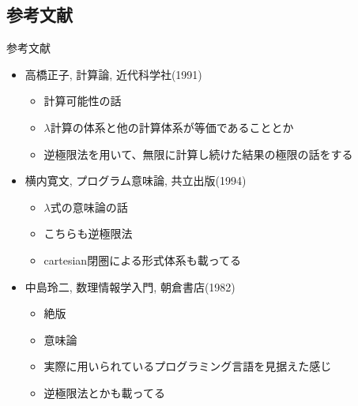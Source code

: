 \documentclass[pdflatex,17pt]{beamer}
\begin{document}
\subsection{参考文献}
\begin{frame}{参考文献}
    \scriptsize
    \begin{itemize}
        \item 高橋正子, 計算論, 近代科学社(1991)
        \begin{itemize}
        \scriptsize
            \item 計算可能性の話
            \item $\lambda$計算の体系と他の計算体系が等価であることとか
            \item 逆極限法を用いて、無限に計算し続けた結果の極限の話をする
        \end{itemize}
        \item 横内寛文, プログラム意味論, 共立出版(1994)
        \begin{itemize}
        \scriptsize
            \item $\lambda$式の意味論の話
            \item こちらも逆極限法
            \item cartesian閉圏による形式体系も載ってる
        \end{itemize}
        \item 中島玲二, 数理情報学入門, 朝倉書店(1982)
        \begin{itemize}
        \scriptsize
            \item 絶版
            \item 意味論
            \item 実際に用いられているプログラミング言語を見据えた感じ
            \item 逆極限法とかも載ってる
        \end{itemize}
    \end{itemize}
\end{frame}
\end{document}
